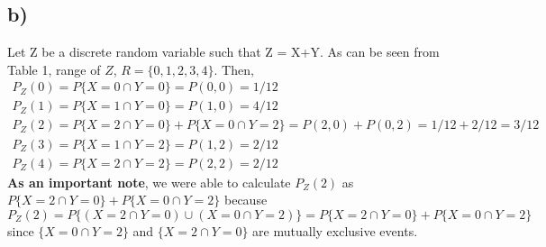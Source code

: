 \documentclass[12pt]{article}
\begin{document}
\subsection*{b)} Let Z be a discrete random variable such that Z = X+Y. As can be seen from Table 1, range of $Z$,  $R =  \{0,1,2,3,4\}$. Then,
\begin{equation*} 
\begin{split}
P_{Z}(0) = P\{X=0 \cap Y=0\} = P(0,0) = 1/12\\
P_{Z}(1) = P\{X=1 \cap Y=0\} = P(1,0) = 4/12\\
P_{Z}(2) = P\{X=2 \cap Y=0\} + P\{X=0 \cap Y=2\} = P(2,0) + P(0,2) = 1/12 + 2/12 = 3/12\\
P_{Z}(3) = P\{X=1 \cap Y=2\} = P(1,2) = 2/12\\
P_{Z}(4) = P\{X=2 \cap Y=2\} = P(2,2) = 2/12
\end{split}
\end{equation*}
\textbf{As an important note}, we were able to calculate $P_{Z}(2)$ as $P\{X=2 \cap Y=0\} + P\{X=0 \cap Y=2\}$ because $P_{Z}(2) = P\{(X=2 \cap Y=0) \cup (X=0 \cap Y=2)\} = P\{X=2 \cap Y=0\} + P\{X=0 \cap Y=2\}$ since $\{X=0 \cap Y=2\}$ and $\{X=2 \cap Y=0\}$ are mutually exclusive events.
\end{document}
